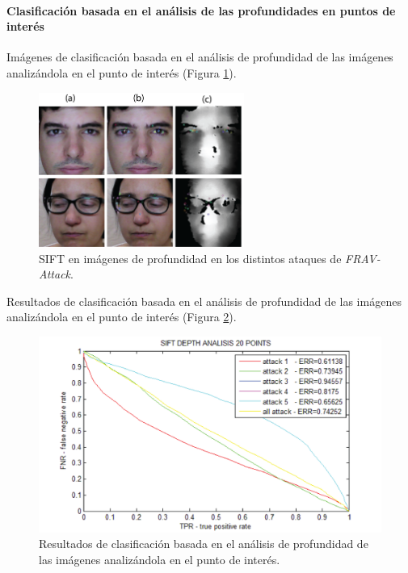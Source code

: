 \paragraph{\textbf{Clasificación basada en el análisis de las profundidades en puntos de interés}}

Imágenes de clasificación basada en el análisis de profundidad de las imágenes analizándola en el punto de interés (Figura \ref{fig:SIFT_EN_IMAGENES_DE_PROFUNDIDAD_EN_ATAQUES}).

\begin{figure}
\centering
\includegraphics[width=0.6\textwidth]{ch-sistemasABC/images/ch-evaluacion_topologias/SIFT_EN_IMGS_PROFUNDIDAD.png}
    \caption{\gls{SIFT} en imágenes de profundidad en los distintos ataques de \textit{\Gls{FRAV-Attack}}.}
    \label{fig:SIFT_EN_IMAGENES_DE_PROFUNDIDAD_EN_ATAQUES}
\end{figure}

Resultados de clasificación basada en el análisis de profundidad de las imágenes analizándola en el punto de interés (Figura \ref{fig:RESULTADOS_PROFUNDIDAD_SIFT}).

\begin{figure}
\centering
\includegraphics[width=1\textwidth]{ch-sistemasABC/images/ch-evaluacion_topologias/RESULTADOS_PROFUNDIDAD_SIFT.png}
    \caption{Resultados de clasificación basada en el análisis de profundidad de las imágenes analizándola en el punto de interés.}
    \label{fig:RESULTADOS_PROFUNDIDAD_SIFT}
\end{figure}

